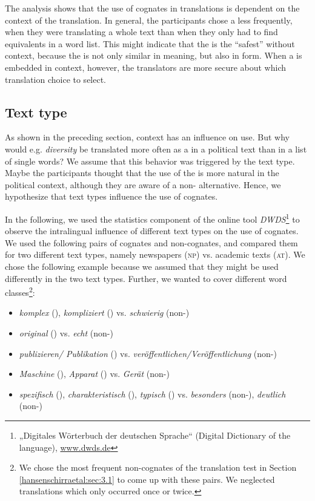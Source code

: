 \documentclass[output=paper]{LSP/langsci}
\begin{document}
The analysis shows that the use of cognates in translations is dependent on the context of the translation. In general, the participants chose a  less frequently, when they were translating a whole text than when they only had to find  equivalents in a word list. This might indicate that the  is the ``safest'' without context, because the  is not only similar in meaning, but also in form. When a  is embedded in context, however, the translators are more secure about which translation choice to select.

\subsection{Text type}\label{hansenschirraetal:sec:3.2}
As shown in the preceding section, context has an influence on  use. But why would e.g. \textit{diversity }be translated more often as a  in a political text than in a list of single words? We assume that this behavior was triggered by the text type. Maybe the participants thought that the use of the  is more natural in the political context, although they are aware of a non- alternative. Hence, we hypothesize that text types influence the use of cognates.

In the following, we used the statistics component of the online tool \textit{DWDS}\footnote{„Digitales Wörterbuch der deutschen Sprache“ (Digital Dictionary of the  language), \url{www.dwds.de}} to observe the intralingual influence of different text types on the use of cognates. We used the following pairs of cognates and non-cognates, and compared them for two different text types, namely newspapers (\textsc{np}) vs. academic texts (\textsc{at}). We chose the following example because we assumed that they might be used differently in the two text types. Further, we wanted to cover different word classes\footnote{We chose the most frequent non-cognates of the translation test in Section \ref{hansenschirraetal:sec:3.1} to come up with these pairs. We neglected translations which only occurred once or twice.}:

\begin{itemize}
\item \textit{komplex} (), \textit{kompliziert }() vs. \textit{schwierig} (non-)
\item \textit{original} () vs. \textit{echt} (non-)
\item \textit{publizieren/ Publikation} () vs. \textit{veröffentlichen/Veröffentlichung} (non-)
\item \textit{Maschine} (), \textit{Apparat} () vs. \textit{Gerät} (non-)
\item \textit{spezifisch} (), \textit{charakteristisch} (), \textit{typisch} () vs. \textit{besonders} (non-), \textit{deutlich} (non-)
\end{itemize}
\end{document}
